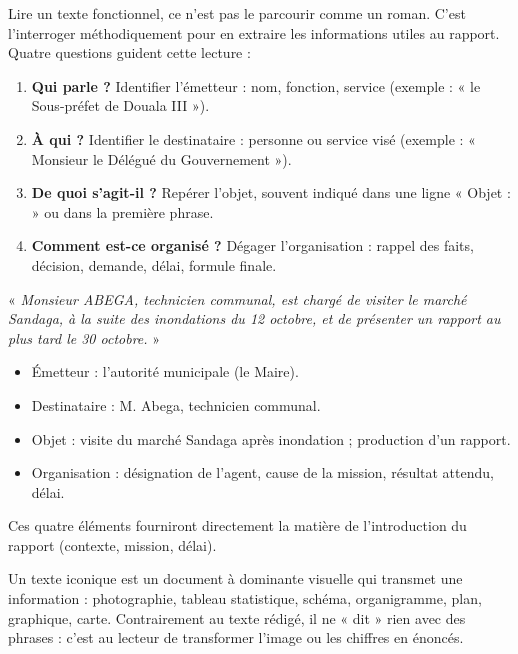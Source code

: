 \documentclass[11pt]{article}
\newcommand{\cle}[1]{{\popxbold\color{popdark}#1}}
\newcounter{popsec}
\newcounter{popsub}
\newcommand{\courssub}[1]{%
  \stepcounter{popsub}%
  \par\vspace{9pt}\noindent{\popxbold\fontsize{11.5}{13}\selectfont\color{popink}{\color{poporange}\thepopsec.\thepopsub}\hspace{6pt}#1}\par\nopagebreak\vspace{4pt}
}
\begin{document}
Lire un texte fonctionnel, ce n'est pas le parcourir comme un roman. C'est l'interroger méthodiquement pour en extraire les informations utiles au rapport. Quatre questions guident cette lecture :

\begin{methode}
\begin{enumerate}
\item \textbf{Qui parle ?} Identifier l'\cle{émetteur} : nom, fonction, service (exemple : « le Sous-préfet de Douala III »).
\item \textbf{À qui ?} Identifier le \cle{destinataire} : personne ou service visé (exemple : « Monsieur le Délégué du Gouvernement »).
\item \textbf{De quoi s'agit-il ?} Repérer l'\cle{objet}, souvent indiqué dans une ligne « Objet : » ou dans la première phrase.
\item \textbf{Comment est-ce organisé ?} Dégager l'\cle{organisation} : rappel des faits, décision, demande, délai, formule finale.
\end{enumerate}
\end{methode}

\begin{exemplebox}
« \emph{Monsieur ABEGA, technicien communal, est chargé de visiter le marché Sandaga, à la suite des inondations du 12 octobre, et de présenter un rapport au plus tard le 30 octobre.} »
\begin{itemize}
\item Émetteur : l'autorité municipale (le Maire).
\item Destinataire : M. Abega, technicien communal.
\item Objet : visite du marché Sandaga après inondation ; production d'un rapport.
\item Organisation : désignation de l'agent, cause de la mission, résultat attendu, délai.
\end{itemize}
Ces quatre éléments fourniront directement la matière de l'introduction du rapport (contexte, mission, délai).
\end{exemplebox}

\courssub{Lecture d'un texte iconique}

\begin{definition}
Un \cle{texte iconique} est un document à dominante visuelle qui transmet une information : \cle{photographie}, \cle{tableau statistique}, \cle{schéma}, \cle{organigramme}, \cle{plan}, graphique, carte. Contrairement au texte rédigé, il ne « dit » rien avec des phrases : c'est au lecteur de transformer l'image ou les chiffres en énoncés.
\end{definition}
\end{document}
